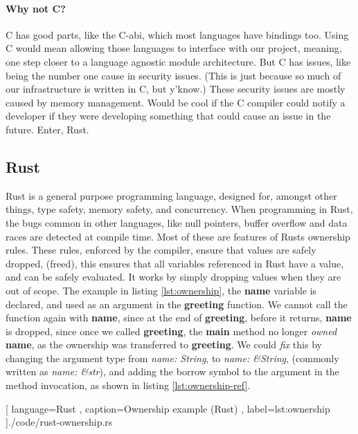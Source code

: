 \paragraph{Why not C?} C has good parts, like the C-\gls{abi}, which most
languages have bindings too. Using C would mean allowing those languages to
interface with our project, meaning, one step closer to a language agnostic
module architecture. But C has issues, like being the number one cause in
security issues. (This is just because so much of our infrastructure is written
in C, but y'know.) These security issues are mostly caused by memory management.
Would be cool if the C compiler could notify a developer if they were developing
something that could cause an issue in the future. Enter, Rust.

\subsection{Rust}

Rust is a general purpose programming language, designed for, amongst other
things, type safety, memory safety, and concurrency. When programming in Rust,
the bugs common in other languages, like null pointers, buffer overflow and data
races are detected at compile time. Most of these are features of Rusts
ownership rules. These rules, enforced by the compiler, ensure that values are
safely dropped, (freed), this ensures that all variables referenced in Rust have
a value, and can be safely evaluated. It works by simply dropping values when
they are out of scope. The example in listing \ref{lst:ownership}, the
\textbf{name} variable is declared, and used as an argument in the
\textbf{greeting} function. We cannot call the function again with
\textbf{name}, since at the end of \textbf{greeting}, before it returns,
\textbf{name} is dropped, since once we called \textbf{greeting}, the
\textbf{main} method no longer \textit{owned} \textbf{name}, as the ownership
was transferred to \textbf{greeting}. We could \textit{fix} this by changing the
argument type from \textit{name: String}, to \textit{name: \&String}, (commonly
written as \textit{name: \&str}), and adding the borrow symbol to the argument in
the method invocation, as shown in listing \ref{lst:ownership-ref}.

\begin{center}
  
    [ language=Rust
    , caption={Ownership example (Rust)}
    , label=lst:ownership
    ]{./code/rust-ownership.rs}
\end{center}

